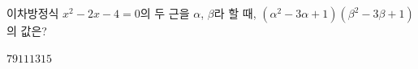 이차방정식 $x^2-2x-4=0$의 두 근을 $\alpha$, $\beta$라 할 때, $(\alpha^2-3\alpha+1)(\beta^2-3\beta+1)$의 값은?
\begin{choices32}{$7$}{$9$}{$11$}{$13$}{$15$}\end{choices32}
